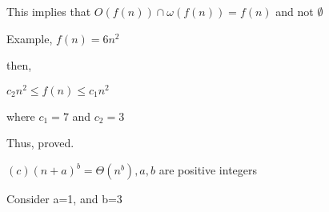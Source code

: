 \documentclass[letterpaper,portrait,12pt]{article}
\begin{document}
\begin{flushleft}

\end{flushleft}


\begin{flushleft}
This implies that $O(f (n)) \cap \omega(f (n)) =$$f(n)$ and not $\emptyset$
\end{flushleft}


\begin{flushleft}

\end{flushleft}


\begin{flushleft}
Example, $f(n)= 6n^2$
\end{flushleft}


\begin{flushleft}
then,
\end{flushleft}


\begin{flushleft}
$c_2n^2\le f(n) \le c_1n^2$
\end{flushleft}


\begin{flushleft}
where $c_1 =7 $ and $c_2 =3 $
\end{flushleft}


\begin{flushleft}

\end{flushleft}


\begin{flushleft}
Thus, proved.
\end{flushleft}


\begin{flushleft}

\end{flushleft}


\begin{flushleft}
$(c) (n + a)^b = \Theta(n^b ), a, b$ are positive integers
\end{flushleft}


\begin{flushleft}

\end{flushleft}


\begin{flushleft}
Consider a=1, and b=3
\end{flushleft}


\begin{flushleft}

\end{flushleft}
\end{document}
